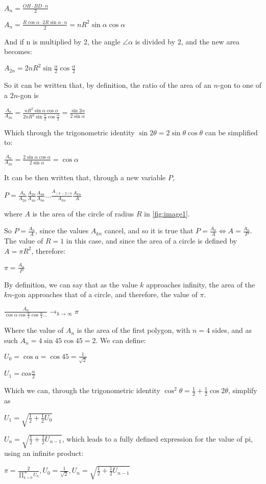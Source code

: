 $A_{n} = \frac{OH \cdot BD \cdot n}{2}$ 

$A_{n} = \frac{R \cos{\alpha} \cdot 2 R \sin{\alpha} \cdot n}{2} = n R^2 \sin{\alpha} \cos{\alpha}$

And if n is multiplied by 2, the angle $\angle \alpha$ is divided by 2, and the new area becomes:

$A_{2n} = 2n R^2 \sin{\frac{\alpha}{2}} \cos{\frac{\alpha}{2}}$

So it can be written that, by definition, the ratio of the area of an $n$-gon to one of a $2n$-gon is

$\frac{A_{n}}{A_{2n}} = \frac{n R^2 \sin{\alpha} \cos{\alpha}}{2 n R^2 \sin{\frac{\alpha}{2}} \cos{\frac{\alpha}{2}}} = \frac{\sin{2 \alpha}}{2 \sin{\alpha}}$

Which through the trigonometric identity $\sin{2 \theta} = 2\sin{\theta} \cos{\theta}$ can be simplified to:

$\frac{A_{n}}{A_{2n}} = \frac{2\sin{\alpha} \cos{\alpha} }{2\sin{\alpha}}  = \cos{\alpha}$

It can be then written that, through a new variable $P$, 

$P = \frac{A_{n}}{A_{2n}} \frac{A_{2n}}{A_{4n}} \frac{A_{4n}}{A_{8n}} \dots \frac{A_{(k-2)n}}{A_{kn}} \frac{A_{kn}}{A}$ 

where $A$ is the area of the circle of radius $R$ in \ref{fig:image1}.

So $P = \frac{A_{n}}{A}$, since the values $A_{kn}$ cancel, and so it is true that $P = \frac{A_{n}}{A} \Leftrightarrow A = \frac{A_{n}}{P}$. The value of $R = 1$ in this case, and since the area of a circle is defined by $A = \pi R^2$, therefore: 

$\pi = \frac{A_{n}}{P}$ 

By definition, we can say that as the value $k$ approaches infinity, the area of the $kn$-gon approaches that of a circle, and therefore, the value of $\pi$.

$\frac{A_{n}}{\cos{\alpha} \cos{\frac{\alpha}{2}} \cos{\frac{\alpha}{4}} \dots}\to_{k \to \infty} \pi$

Where the value of $A_{n}$ is the area of the first polygon, with $n=4$ sides, and as such $A_{n} = 4 \sin{45} \cos{45} = 2$. We can define:

$U_{0} = \cos{a} = \cos{45} = \frac{1}{\sqrt{2}}$ 

$U_{1} = cos{\frac{\alpha}{2}}$ 

Which we can, through the trigonometric identity $\cos^2{\theta} = \frac{1}{2} + \frac{1}{2} \cos{2\theta}$, simplify as

$U_{1} = \sqrt{\frac{1}{2} + \frac{1}{2} U_{0}}$ 

$U_{n} = \sqrt{\frac{1}{2} + \frac{1}{2} U_{n - 1}}$, which leads to a fully defined expression for the value of pi, using an infinite product:

$\pi = \frac{2}{\prod\limits_{k=0}^\infty U_{k}}, U_{0} = \frac{1}{\sqrt{2}}, U_{n} = \sqrt{\frac{1}{2} + \frac{1}{2} U_{n - 1}}$ \footnotemark



